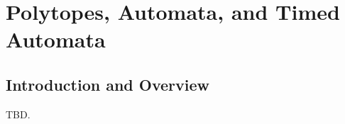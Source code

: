 \chapter{Polytopes, Automata, and Timed Automata}
\label{cpta0}

\section{Introduction and Overview}
\label{cpta0:siov0}

TBD.

